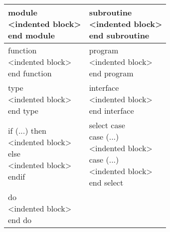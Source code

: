 \documentclass{article}
\begin{document}
{\tt
\begin{tabular}[t]{|l|l|}
\hline
\parbox[t]{2in}{module\\ \hspace*{0.15in}<indented block>\\end module\\ } &
\parbox[t]{2in}{subroutine\\ \hspace*{0.15in}<indented block>\\end subroutine\\} \\
\hline
\parbox[t]{2in}{function\\ \hspace*{0.15in}<indented block>\\end function\\} &
\parbox[t]{2in}{program\\ \hspace*{0.15in}<indented block>\\end program\\} \\
\hline
\parbox[t]{2in}{type\\ \hspace*{0.15in}<indented block>\\end type\\} &
\parbox[t]{2in}{interface\\ \hspace*{0.15in}<indented block>\\end interface\\} \\
\hline
\parbox[t]{2in}{if (...) then\\ \hspace*{0.15in}<indented block>\\else\\ \hspace*{0.15in}<indented block>\\ endif\\} &
\parbox[t]{2in}{select case \\ case (...)\\ \hspace*{0.15in}<indented block>
\\ case (...)\\ \hspace*{0.15in}<indented block>\\end select\\} \\
\hline
\parbox[t]{2in}{do\\ \hspace*{0.15in}<indented block>\\end do\\} & \\
\hline
\end{tabular}
}
\end{document}
